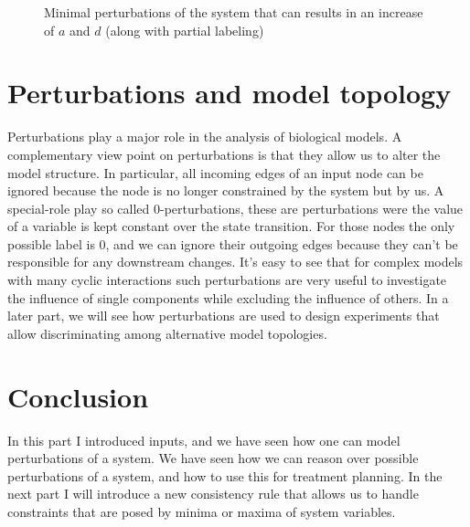 \begin{figure}
\begin{center}
  
\end{center}
\caption{Minimal perturbations of the system that can results in an increase of $a$ and $d$ (along with partial labeling)}
\label{fig:ig_labeled3}
\end{figure}

\section*{Perturbations and model topology}

Perturbations play a major role in the analysis of biological models.
A complementary view point on perturbations is that they allow us to alter the model structure.
In particular, all incoming edges of an input node can be ignored because the node is no longer constrained by the system but by us.
A special-role play so called 0-perturbations, 
 these are perturbations were the value of a variable is kept constant over the state transition.
For those nodes the only possible label is 0,
and we can ignore their outgoing edges because they can't be responsible for any downstream changes.
It's easy to see that for complex models with many cyclic interactions such perturbations are very useful
 to investigate the influence of single components while excluding the influence of others.
In a later part, we will see how perturbations are used to design experiments that allow discriminating among alternative model topologies.

\section*{Conclusion}

In this part I introduced inputs,
and we have seen how one can model perturbations of a system.
We have seen how we can reason over possible perturbations of a system, and how to use this for treatment planning.
In the next part I will introduce a new consistency rule that allows us to handle constraints that are posed by minima or maxima of system variables.
